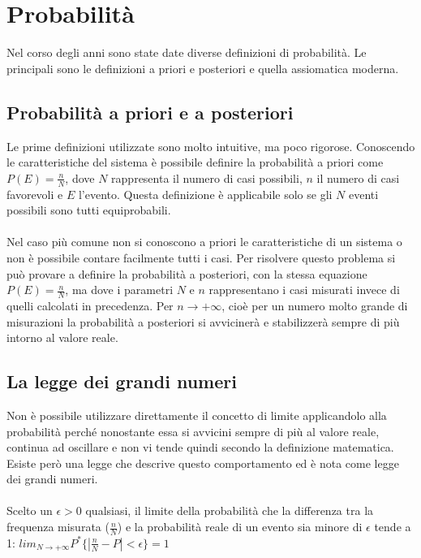 \documentclass{article}
\begin{document}
\section{Probabilità}
Nel corso degli anni sono state date diverse definizioni di probabilità. Le principali sono le definizioni a priori e posteriori e quella assiomatica moderna.
\subsection{Probabilità a priori e a posteriori}
Le prime definizioni utilizzate sono molto intuitive, ma poco rigorose. Conoscendo le caratteristiche del sistema è possibile definire la probabilità a priori come $P(E)=\frac{n}{N}$, dove $N$ rappresenta il numero di casi possibili, $n$ il numero di casi favorevoli e $E$ l'evento. Questa definizione è applicabile solo se gli $N$ eventi possibili sono tutti equiprobabili.\\\\
Nel caso più comune non si conoscono a priori le caratteristiche di un sistema o non è possibile contare facilmente tutti i casi. Per risolvere questo problema si può provare a definire la probabilità a posteriori, con la stessa equazione $P(E)=\frac{n}{N}$, ma dove i parametri $N$ e $n$ rappresentano i casi misurati invece di quelli calcolati in precedenza. Per $n \rightarrow +\infty$, cioè per un numero molto grande di misurazioni la probabilità a posteriori si avvicinerà e stabilizzerà sempre di più intorno al valore reale.
\subsection{La legge dei grandi numeri}
Non è possibile utilizzare direttamente il concetto di limite applicandolo alla probabilità perché nonostante essa si avvicini sempre di più al valore reale, continua ad oscillare e non vi tende quindi secondo la definizione matematica. Esiste però una legge che descrive questo comportamento ed è nota come legge dei grandi numeri.\\\\
Scelto un $\epsilon>0$ qualsiasi, il limite della probabilità che la differenza tra la frequenza misurata ($\frac{n}{N}$) e la probabilità reale di un evento sia minore di $\epsilon$ tende a 1: \quad
$lim_{N \rightarrow +\infty} P^*\{\left|\frac{n}{N} - P \right| < \epsilon \} = 1$
\end{document}
